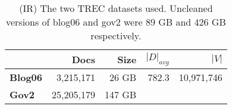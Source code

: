 \begin{table}
\centering
{\small
\begin{tabular}{|l|r|r|r|r|}
    \hline & \textbf{Docs} & \textbf{Size} & \textbf{$|D|_{avg}$} &
    \textbf{$|V|$} \\
    \hline
    \textbf{Blog06} & 3,215,171 & 26 GB & 782.3 & 10,971,746 \\
    \textbf{Gov2} & 25,205,179 & 147 GB & & \\
    \hline
\end{tabular}
\caption{(IR) The two TREC datasets used. Uncleaned versions of blog06 and gov2
    were 89 GB and 426 GB respectively.}
\label{table:ir-datasets}
}
\end{table}
